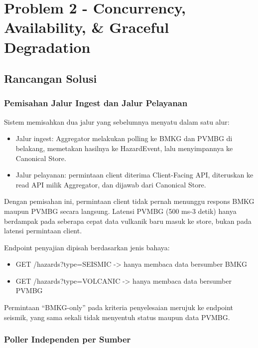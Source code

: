 \chapter{Problem 2 - Concurrency, Availability, \& Graceful Degradation}

\section{Rancangan Solusi}

\subsection{Pemisahan Jalur Ingest dan Jalur Pelayanan}\label{sec:p2-jalur}

Sistem memisahkan dua jalur yang sebelumnya menyatu dalam satu alur:

\begin{itemize}
\tightlist
\item
  Jalur ingest: Aggregator melakukan polling ke BMKG dan PVMBG di belakang, memetakan hasilnya ke HazardEvent, lalu menyimpannya ke Canonical Store.\\
\item
  Jalur pelayanan: permintaan client diterima Client-Facing API, diteruskan ke read API milik Aggregator, dan dijawab dari Canonical Store.
\end{itemize}

Dengan pemisahan ini, permintaan client tidak pernah menunggu respons BMKG maupun PVMBG secara langsung. Latensi PVMBG (500 ms-3 detik) hanya berdampak pada seberapa cepat data vulkanik baru masuk ke store, bukan pada latensi permintaan client.

Endpoint penyajian dipisah berdasarkan jenis bahaya:

\begin{itemize}
\tightlist
\item
  GET /hazards?type=SEISMIC -\textgreater{} hanya membaca data bersumber BMKG\\
\item
  GET /hazards?type=VOLCANIC -\textgreater{} hanya membaca data bersumber PVMBG
\end{itemize}

Permintaan ``BMKG-only'' pada kriteria penyelesaian merujuk ke endpoint seismik, yang sama sekali tidak menyentuh status maupun data PVMBG.

\subsection{Poller Independen per Sumber}\label{sec:p2-poller}

